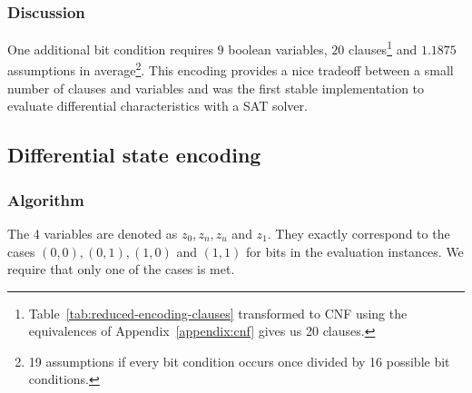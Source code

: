 \subsubsection{Discussion}
\label{sec:reduced-encoding-discussion}
%
One additional bit condition requires $9$ boolean variables, $20$ clauses\footnote{Table~\ref{tab:reduced-encoding-clauses} transformed to CNF using the equivalences of Appendix~\ref{appendix:cnf} gives us 20 clauses.} and $1.1875$ assumptions in average\footnote{19 assumptions if every bit condition occurs once divided by 16 possible bit conditions.}.
This encoding provides a nice tradeoff between a small number of clauses and variables and was the first stable implementation to evaluate differential characteristics with a SAT solver.

\newpage
\subsection{Differential state encoding}
\label{sec:encoding:dse}
%
\subsubsection{Algorithm}
\label{sec:encoding:dse-algorithm}
%
The 4 variables are denoted as $z_0, z_n, z_u$ and $z_1$. They exactly correspond to the cases $(0, 0), (0, 1), (1, 0)$ and $(1, 1)$ for bits in the evaluation instances. We require that only one of the cases is met.

